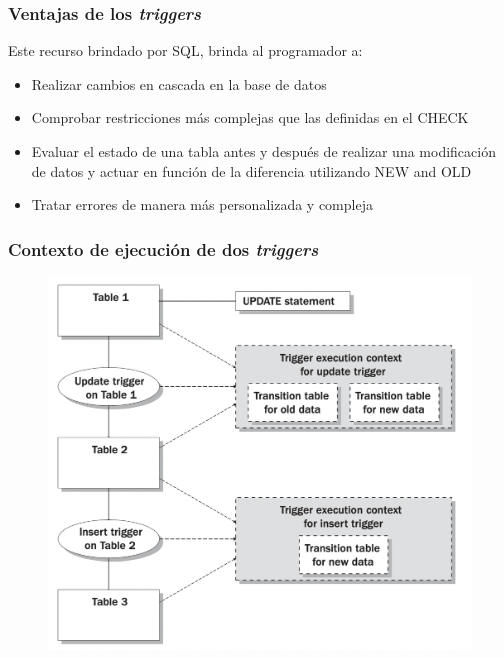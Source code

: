 \documentclass[
	10pt, %
	aspectratio=169, %
]{beamer}
\begin{document}

\begin{frame}[fragile]
	
	\frametitle{Ventajas de los \emph{triggers}}
	
	Este recurso brindado por SQL, brinda al programador a:
	
	\begin{itemize}
		
		\item Realizar cambios en cascada en la base de datos
		
		\pause 
		
		\item Comprobar restricciones más complejas que las definidas en el \textcolor{codepurple}{CHECK}
		
		\pause
		
		\item Evaluar el estado de una tabla antes y después de realizar una modificación de datos y actuar en función de la diferencia utilizando \textcolor{codepurple}{NEW} and \textcolor{codepurple}{OLD}
		
		\pause
		
		\item Tratar errores de manera más personalizada y compleja
		
	\end{itemize}

\end{frame}


\begin{frame}[fragile]
	
	\frametitle{Contexto de ejecución de dos \emph{triggers}}
	
	\begin{figure}[h]
		\centering
		\includegraphics[scale=0.4]{flujo-trigger.png}
	\end{figure}

\end{frame}
\end{document}
